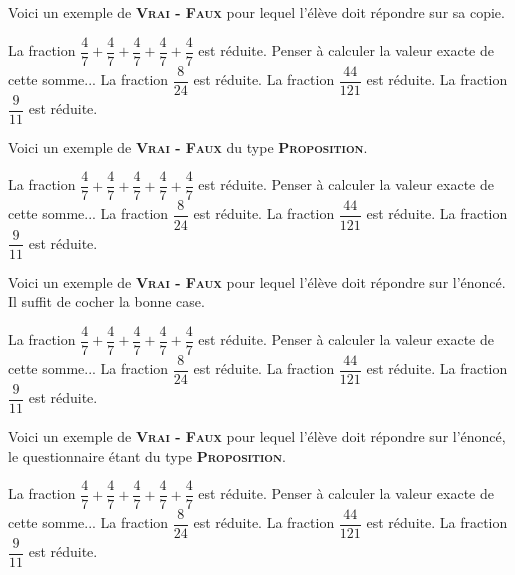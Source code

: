 \documentclass[a4,12pt]{article}
\begin{document}
\exam[kind = test]


\exercise{}

Voici un exemple de \textbf{\textsc{Vrai - Faux}}
pour lequel l'élève doit répondre sur sa copie.

\begin{trueFalse}
	\prop La fraction $\dfrac{4}{7}+\dfrac{4}{7}+\dfrac{4}{7}+\dfrac{4}{7}+\dfrac{4}{7}$
	est réduite. Penser à calculer la valeur exacte de cette somme...
	\prop La fraction $\dfrac{8}{24}$ est réduite.
	\prop La fraction $\dfrac{44}{121}$ est réduite.
	\prop La fraction $\dfrac{9}{11}$ est réduite.
\end{trueFalse}


\exercise{}

Voici un exemple de \textbf{\textsc{Vrai - Faux}}
du type \textbf{\textsc{Proposition}}.

\begin{trueFalse}[proposition]
	\prop La fraction $\dfrac{4}{7}+\dfrac{4}{7}+\dfrac{4}{7}+\dfrac{4}{7}+\dfrac{4}{7}$
	est réduite. Penser à calculer la valeur exacte de cette somme...
	\prop La fraction $\dfrac{8}{24}$ est réduite.
	\prop La fraction $\dfrac{44}{121}$ est réduite.
	\prop La fraction $\dfrac{9}{11}$ est réduite.
\end{trueFalse}


\newpage

\problem*{}

Voici un exemple de \textbf{\textsc{Vrai - Faux}}
pour lequel l'élève doit répondre sur l'énoncé.
Il suffit de cocher la bonne case.

\begin{trueFalse}
	\prop La fraction $\dfrac{4}{7}+\dfrac{4}{7}+\dfrac{4}{7}+\dfrac{4}{7}+\dfrac{4}{7}$
	est réduite. Penser à calculer la valeur exacte de cette somme...
	\prop La fraction $\dfrac{8}{24}$ est réduite.
	\prop La fraction $\dfrac{44}{121}$ est réduite.
	\prop La fraction $\dfrac{9}{11}$ est réduite.
\end{trueFalse}


\newpage

\problem*{}

Voici un exemple de \textbf{\textsc{Vrai - Faux}}
pour lequel l'élève doit répondre sur l'énoncé,
le questionnaire étant du type \textbf{\textsc{Proposition}}.

\begin{trueFalse}[proposition]
	\prop La fraction $\dfrac{4}{7}+\dfrac{4}{7}+\dfrac{4}{7}+\dfrac{4}{7}+\dfrac{4}{7}$
	est réduite. Penser à calculer la valeur exacte de cette somme...
	\prop La fraction $\dfrac{8}{24}$ est réduite.
	\prop La fraction $\dfrac{44}{121}$ est réduite.
	\prop La fraction $\dfrac{9}{11}$ est réduite.
\end{trueFalse}
\end{document}
